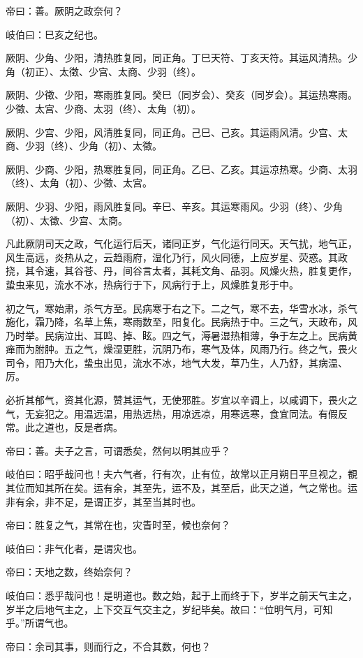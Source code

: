 \documentclass{article}%
\begin{document}
帝曰：善。厥阴之政奈何？

岐伯曰：巳亥之纪也。

厥阴、少角、少阳，清热胜复同，同正角。丁巳天符、丁亥天符。其运风清热。少角（初正）、太徵、少宫、太商、少羽（终）。

厥阴、少徵、少阳，寒雨胜复同。癸巳（同岁会）、癸亥（同岁会）。其运热寒雨。少徵、太宫、少商、太羽（终）、太角（初）。

厥阴、少宫、少阳，风清胜复同，同正角。己巳、己亥。其运雨风清。少宫、太商、少羽（终）、少角（初）、太徵。

厥阴、少商、少阳，热寒胜复同，同正角。乙巳、乙亥。其运凉热寒。少商、太羽（终）、太角（初）、少徵、太宫。

厥阴、少羽、少阳，雨风胜复同。辛巳、辛亥。其运寒雨风。少羽（终）、少角（初）、太徵、少宫、太商。

凡此厥阴司天之政，气化运行后天，诸同正岁，气化运行同天。天气扰，地气正，风生高远，炎热从之，云趋雨府，湿化乃行，风火同德，上应岁星、荧惑。其政挠，其令速，其谷苍、丹，间谷言太者，其耗文角、品羽。风燥火热，胜复更作，蛰虫来见，流水不冰，热病行于下，风病行于上，风燥胜复形于中。

初之气，寒始肃，杀气方至。民病寒于右之下。二之气，寒不去，华雪水冰，杀气施化，霜乃降，名草上焦，寒雨数至，阳复化。民病热于中。三之气，天政布，风乃时举。民病泣出、耳鸣、掉、眩。四之气，溽暑湿热相薄，争于左之上。民病黄瘅而为胕肿。五之气，燥湿更胜，沉阴乃布，寒气及体，风雨乃行。终之气，畏火司令，阳乃大化，蛰虫出见，流水不冰，地气大发，草乃生，人乃舒，其病温、厉。

必折其郁气，资其化源，赞其运气，无使邪胜。岁宜以辛调上，以咸调下，畏火之气，无妄犯之。用温远温，用热远热，用凉远凉，用寒远寒，食宜同法。有假反常。此之道也，反是者病。

帝曰：善。夫子之言，可谓悉矣，然何以明其应乎？

岐伯曰：昭乎哉问也！夫六气者，行有次，止有位，故常以正月朔日平旦视之，覩其位而知其所在矣。运有余，其至先，运不及，其至后，此天之道，气之常也。运非有余，非不足，是谓正岁，其至当其时也。

帝曰：胜复之气，其常在也，灾眚时至，候也奈何？

岐伯曰：非气化者，是谓灾也。

帝曰：天地之数，终始奈何？

岐伯曰：悉乎哉问也！是明道也。数之始，起于上而终于下，岁半之前天气主之，岁半之后地气主之，上下交互气交主之，岁纪毕矣。故曰：“位明气月，可知乎。”所谓气也。

帝曰：余司其事，则而行之，不合其数，何也？
\end{document}
